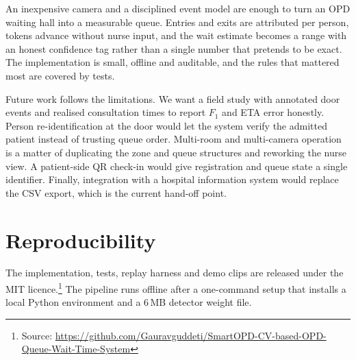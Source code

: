 \documentclass[conference]{IEEEtran}
\begin{document}
An inexpensive camera and a disciplined event model are enough to turn an OPD
waiting hall into a measurable queue. Entries and exits are attributed per
person, tokens advance without nurse input, and the wait estimate becomes a
range with an honest confidence tag rather than a single number that pretends to
be exact. The implementation is small, offline and auditable, and the rules that
mattered most are covered by tests.

Future work follows the limitations. We want a field study with annotated door
events and realised consultation times to report $F_1$ and ETA error honestly.
Person re-identification at the door would let the system verify the admitted
patient instead of trusting queue order. Multi-room and multi-camera operation
is a matter of duplicating the zone and queue structures and reworking the
nurse view. A patient-side QR check-in would give registration and queue state a
single identifier. Finally, integration with a hospital information system would
replace the CSV export, which is the current hand-off point.

\section*{Reproducibility}
The implementation, tests, replay harness and demo clips are released under the
MIT licence.\footnote{Source:
\url{https://github.com/Gauravguddeti/SmartOPD-CV-based-OPD-Queue-Wait-Time-System}}
The pipeline runs offline after a one-command setup that installs a local Python
environment and a 6\,MB detector weight file.
\end{document}
